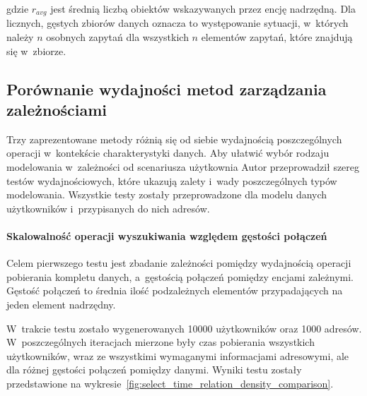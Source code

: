 gdzie $r_{avg}$ jest średnią liczbą obiektów wskazywanych przez encję nadrzędną. Dla licznych, gęstych zbiorów danych oznacza to występowanie sytuacji, w~których należy $n$ osobnych zapytań dla wszystkich $n$ elementów zapytań, które znajdują się w~zbiorze.

\subsection{Porównanie wydajności metod zarządzania zależnościami}

Trzy zaprezentowane metody różnią się od siebie wydajnością poszczególnych operacji w~kontekście charakterystyki danych. Aby ułatwić wybór rodzaju modelowania w~zależności od scenariusza użytkownia Autor przeprowadził szereg testów wydajnościowych, które ukazują zalety i~wady poszczególnych typów modelowania. Wszystkie testy zostały przeprowadzone dla modelu danych użytkowników i~przypisanych do nich adresów.

\paragraph{Skalowalność operacji wyszukiwania względem gęstości połączeń} 

Celem pierwszego testu jest zbadanie zależności pomiędzy wydajnością operacji pobierania kompletu danych, a~gęstością połączeń pomiędzy encjami zależnymi. Gęstość połączeń to średnia ilość podzależnych elementów przypadających na jeden element nadrzędny. 

W~trakcie testu zostało wygenerowanych 10000 użytkowników oraz 1000 adresów. W~poszczególnych iteracjach mierzone były czas pobierania wszystkich użytkowników, wraz ze wszystkimi wymaganymi informacjami adresowymi, ale dla różnej gęstości połączeń pomiędzy danymi. Wyniki testu zostały przedstawione na wykresie~\ref{fig:select_time_relation_density_comparison}.

